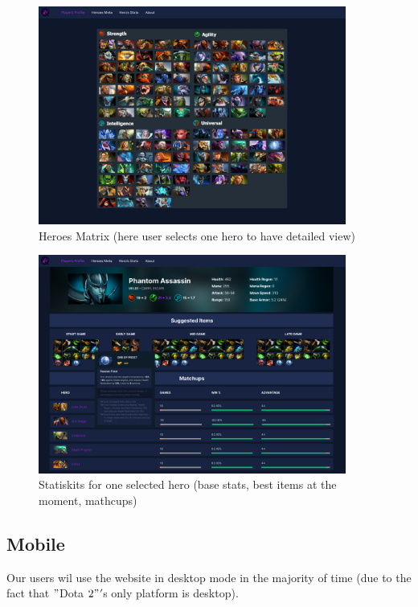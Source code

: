     \begin{figure}[ht]
        \centering
        \includegraphics[width=0.9\textwidth]{images/HeroMatrix}
        \caption{Heroes Matrix (here user selects one hero to have detailed view)}
    \end{figure}

    \begin{figure}[ht]
        \centering
        \includegraphics[width=0.9\textwidth]{images/SelectedHero}
        \caption{Statiskits for one selected hero (base stats, best items at the moment, mathcups)}
    \end{figure}

    \clearpage

    \subsection{Mobile}

    Our users wil use the website in desktop mode in the majority of time (due to the fact that \("\)Dota \(2"\)\('\)s only platform is desktop).

